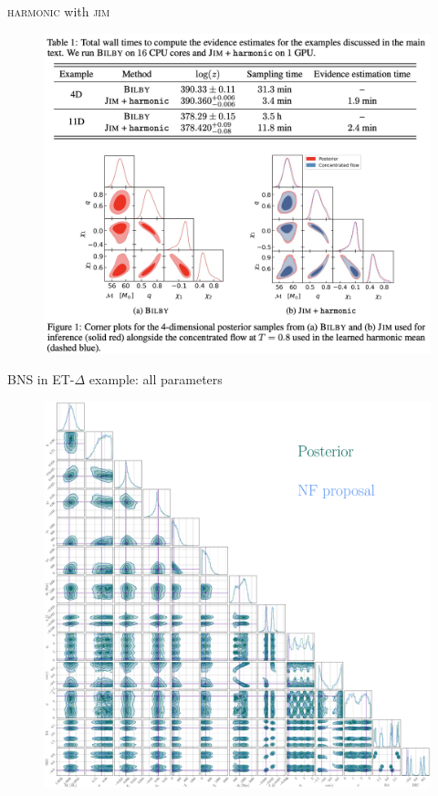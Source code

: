 \documentclass[usenames,dvipsnames,t]{beamer}
\begin{document}
\begin{frame}{\textsc{harmonic} with \textsc{jim}~\cite{Polanska:2024zpn}}
  \begin{figure}
    \centering
    \includegraphics[scale=0.275]{Figures/polanska.jpg}
  \end{figure}
  
\end{frame}

\begin{frame}{BNS in ET-$\Delta$ example: all parameters}
  \vspace{-3mm}
  \begin{figure}
    \centering
    \includegraphics[scale=0.1125]{Figures/corner_plot_big.pdf}
  \end{figure}
\end{frame}
\end{document}
